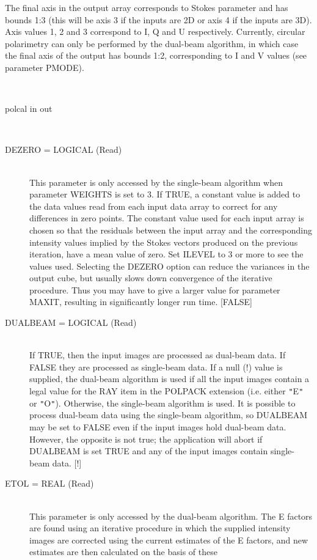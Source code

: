 \documentclass[twoside,11pt]{article}
\renewcommand{\_}{\texttt{\symbol{95}}}
\newcommand{\sstusage}[1]{\item[Usage:] \mbox{}
\\[1.3ex]{\raggedright \ssttt #1}}
\newcommand{\sstparameters}[1]{
   \item[Parameters:] \mbox{} \\
   \vspace{-3.5ex}
   \begin{description}
      #1
   \end{description}
}
\newcommand{\sstsubsection}[1]{ \item[{#1}] \mbox{} \\}
\newcommand{\sstusage}[1]{\item[Usage:]
      \begin{description}
         {\ssttt #1}
      \end{description}
      \\
   }
\newcommand{\sstparameters}[1]{
      \item[Parameters:] \\
      \begin{description}
         #1
      \end{description}
      \\
   }
\newcommand{\sstsubsection}[1]{\item[{#1}]}
\begin{document}
{{      The final axis in the output array corresponds to Stokes parameter
      and has bounds 1:3 (this will be axis 3 if the inputs are 2D or axis
      4 if the inputs are 3D). Axis values 1, 2 and 3 correspond to I, Q
      and U respectively. Currently, circular polarimetry can only be
      performed by the dual-beam algorithm, in which case the final axis of
      the output has bounds 1:2, corresponding to I and V values (see
      parameter PMODE).
   }
   \sstusage{
      polcal in out
   }
   \sstparameters{
      \sstsubsection{
         DEZERO = \_LOGICAL (Read)
      }{
         This parameter is only accessed by the single-beam algorithm
         when parameter WEIGHTS is set to 3. If TRUE, a constant value
         is added to the data values read from each input data array
         to correct for any differences in zero points. The constant
         value used for each input array is chosen so that the residuals
         between the input array and the corresponding intensity values
         implied by the Stokes vectors produced on the previous iteration,
         have a mean value of zero. Set ILEVEL to 3 or more to see the
         values used. Selecting the DEZERO option can reduce the variances
         in the output cube, but usually slows down convergence of the
         iterative procedure. Thus you may have to give a larger value
         for parameter MAXIT, resulting in significantly longer run time.
         [FALSE]
      }
      \sstsubsection{
         DUALBEAM = \_LOGICAL (Read)
      }{
         If TRUE, then the input images are processed as dual-beam data.
         If FALSE they are processed as single-beam data. If a null (!)
         value is supplied, the dual-beam algorithm is used if all the input
         images contain a legal value for the RAY item in the POLPACK
         extension (i.e. either {\tt "}E{\tt "} or {\tt "}O{\tt "}). Otherwise, the single-beam
         algorithm is used. It is possible to process dual-beam data using
         the single-beam algorithm, so DUALBEAM may be set to FALSE even
         if the input images hold dual-beam data. However, the opposite
         is not true; the application will abort if DUALBEAM is set TRUE and
         any of the input images contain single-beam data. [!]
      }
      \sstsubsection{
         ETOL = \_REAL (Read)
      }{
         This parameter is only accessed by the dual-beam algorithm. The E
         factors are found using an iterative procedure in which the supplied
         intensity images are corrected using the current estimates of the E
         factors, and new estimates are then calculated on the basis of these
}}}
\end{document}
